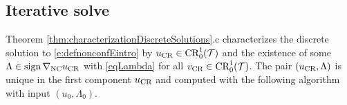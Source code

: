 \subsection{Iterative solve}
Theorem
\ref{thm:characterizationDiscreteSolutions}.c
characterizes the discrete solution to  
\eqref{e:defnonconfEintro} 
by $u_{\textup{CR}}\in\textup{CR}^1_0(\mathcal T)$ and 
the existence of some 
$
  \Lambda\in\operatorname{sign}\nabla_{\textup{NC}}u_{\textup{CR}}
$ 
with \eqref{eqLambda}
for all $v_{\textup{CR}}\in\textup{CR}^1_0(\mathcal{T})$.
The pair $(u_\textup{CR},\Lambda)$ is unique in the first component $u_\textup{CR}$
and computed with the following algorithm with input $(u_0,\Lambda_0)$.



